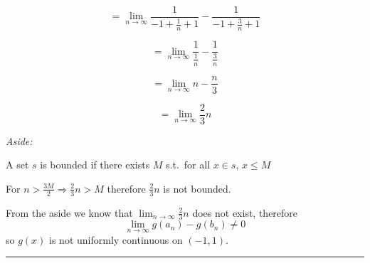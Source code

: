 \documentclass[10pt,letterpaper]{article}
\newcommand\ds{\displaystyle}
\newcommand\qedsym{\hfill \rule{2mm}{2mm}}
\begin{document}
\[=\ds\lim_{n\to\infty}\frac{1}{-1+\frac{1}{n}+1}-\frac{1}{-1 + \frac{3}{n}+1}\]

\[=\ds\lim_{n\to\infty}\frac{1}{\frac{1}{n}}-\frac{1}{\frac{3}{n}}\]

\[=\lim_{n\to\infty}n-\frac{n}{3}\]

\[=\lim_{n\to\infty}\frac{2}{3}n\]

{\addtolength{\leftskip}{5mm}
\textit{Aside:}

A set $s$ is bounded if there exists $M$ s.t.\ for all $x\in s$, $x\leq M$

For $\ds n>\frac{3M}{2} \Rightarrow \frac{2}{3}n > M$ therefore $\frac{2}{3}n$ is not bounded.

}

From the aside we know that $\ds\lim_{n\to\infty}\frac{2}{3}n$ does not exist, therefore \[\ds\lim_{n\to\infty}g(a_n)-g(b_n) \neq 0\] so $g(x)$ is not uniformly continuous on $(-1,1)$.

\qedsym
\end{document}

